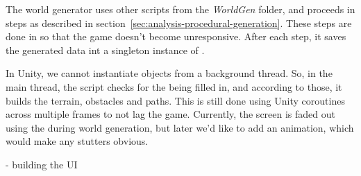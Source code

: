 The world generator uses other scripts from the \emph{WorldGen} folder, and proceeds in steps as described in section~\ref{sec:analysis-procedural-generation}.
These steps are done in so that the game doesn't become unresponsive.
After each step, it saves the generated data int a singleton instance of .

In Unity, we cannot instantiate objects from a background thread.
So, in the main thread, the script  checks for the  being filled in, and according to those, it builds the terrain, obstacles and paths.
This is still done using Unity coroutines across multiple frames to not lag the game.
Currently, the screen is faded out using the  during world generation, but later we'd like to add an animation, which would make any stutters obvious.

- building the UI